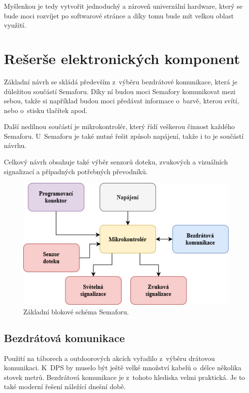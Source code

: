 Myšlenkou je tedy vytvořit jednoduchý a zároveň univerzální hardware, který se bude moci rozvíjet po softwarové stránce a díky tomu bude mít velkou 
oblast využití. 


\chapter{Rešerše elektronických komponent}
Základní návrh se skládá především z~výběru bezdrátové komunikace, která je důležitou součástí Semaforu. Díky ní budou moci Semafory 
komunikovat mezi sebou, takže si například budou moci předávat informace o~barvě, kterou svítí, nebo o~stisku tlačítek apod. 

Další nedílnou součástí je mikrokontrolér, který řídí veškerou činnost každého Semaforu. U~Semaforu je také nutné řešit způsob napájení,
takže i to je součástí návrhu.

Celkový návrh obsahuje také výběr senzorů doteku, zvukových a vizuálních signalizací a případných potřebných převodníků. 

\begin{figure}[!h]
  \begin{center}
    \includegraphics[scale=0.7]{obrazky/zakladni_blokove_schema.jpg}
  \end{center}
  \caption[Základní blokové schéma Semaforu]{Základní blokové schéma Semaforu.}
\end{figure}

\section{Bezdrátová komunikace}
Použití na táborech a outdoorových akcích vyřadilo z~výběru drátovou komunikaci. K~DPS by muselo být ještě velké množství kabelů 
o~délce několika stovek metrů. Bezdrátová komunikace je z~tohoto hlediska velmi praktická. Je to také moderní řešení 
náležící dnešní době. 


